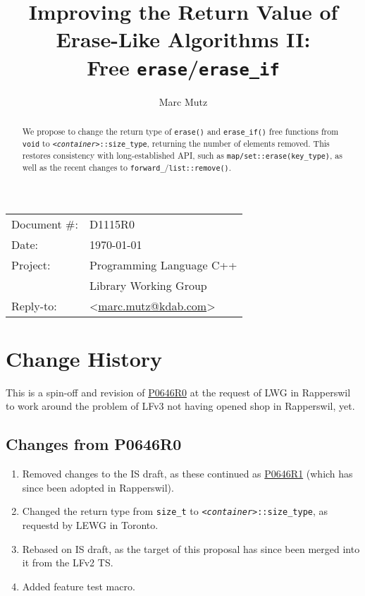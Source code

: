 \documentclass[11pt]{article}
\date{}
\title{Improving the Return Value of Erase-Like Algorithms II:\\ Free
  \texttt{erase}/\texttt{erase\_if}}
\makeatletter
\newcommand{\emailaddress}{marc.mutz@kdab.com}
\newcommand{\email}{\href{mailto:\emailaddress}{\emailaddress}}
\newcommand{\wgpaper}[1]{\href{https://wg21.link/#1}{#1}}
\newcommand{\cst}{\texttt{\textit{<container>}::size\_type}}
\makeatother
\begin{document}
\maketitle\vspace{-2cm}

\begin{tabular}{ll}
  Document \#:&D1115R0\\
  Date:       &\today\\
  Project:    &Programming Language C++\\
              &Library Working Group\\
  Reply-to:   &\author{Marc Mutz} \textless\email\textgreater
\end{tabular}
\vspace{1cm}
\begin{abstract}
  We propose to change the return type of \texttt{erase()} and
  \texttt{erase\_if()} free functions from \texttt{void} to \cst,
  returning the number of elements removed. This restores consistency
  with long-established API, such as
  \texttt{map/set::erase(key\_type)}, as well as the recent changes to
  \texttt{forward\_}/\texttt{list::remove()}.
\end{abstract}


\tableofcontents

\section{Change History}

This is a spin-off and revision of \wgpaper{P0646R0} at the request of
LWG in Rapperswil to work around the problem of LFv3 not having opened
shop in Rapperswil, yet.

\subsection{Changes from P0646R0}

\begin{enumerate}
\item Removed changes to the IS draft, as these continued as
  \wgpaper{P0646R1} (which has since been adopted in Rapperswil).
\item Changed the return type from \texttt{size\_t} to
  \cst, as requestd by LEWG in Toronto.
\item Rebased on IS draft, as the target of this proposal has since
  been merged into it from the LFv2 TS.
\item Added feature test macro.
\end{enumerate}
\end{document}
